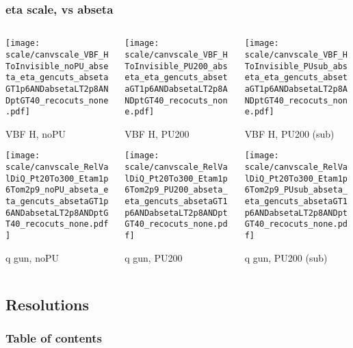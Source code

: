 \documentclass[8pt]{beamer}
\begin{document}
  \begin{frame}
  \frametitle{eta scale, vs abseta}
  
  \begin{columns}
   \begin{column}{0.35\textwidth}
     \texttt{[image: scale/canvscale\_VBF\_HToInvisible\_noPU\_abseta\_eta\_gencuts\_absetaGT1p6ANDabsetaLT2p8ANDptGT40\_recocuts\_none.pdf]}
     
     VBF H, noPU
    
     \texttt{[image: scale/canvscale\_RelValDiQ\_Pt20To300\_Etam1p6Tom2p9\_noPU\_abseta\_eta\_gencuts\_absetaGT1p6ANDabsetaLT2p8ANDptGT40\_recocuts\_none.pdf]}
     
     q gun, noPU
   \end{column}
   \begin{column}{0.35\textwidth}
     \texttt{[image: scale/canvscale\_VBF\_HToInvisible\_PU200\_abseta\_eta\_gencuts\_absetaGT1p6ANDabsetaLT2p8ANDptGT40\_recocuts\_none.pdf]}
     
     VBF H, PU200
    
     \texttt{[image: scale/canvscale\_RelValDiQ\_Pt20To300\_Etam1p6Tom2p9\_PU200\_abseta\_eta\_gencuts\_absetaGT1p6ANDabsetaLT2p8ANDptGT40\_recocuts\_none.pdf]}
     
     q gun, PU200
   \end{column}
   \begin{column}{0.35\textwidth}
     \texttt{[image: scale/canvscale\_VBF\_HToInvisible\_PUsub\_abseta\_eta\_gencuts\_absetaGT1p6ANDabsetaLT2p8ANDptGT40\_recocuts\_none.pdf]}
     
     VBF H, PU200 (sub)
    
     \texttt{[image: scale/canvscale\_RelValDiQ\_Pt20To300\_Etam1p6Tom2p9\_PUsub\_abseta\_eta\_gencuts\_absetaGT1p6ANDabsetaLT2p8ANDptGT40\_recocuts\_none.pdf]}
     
     q gun, PU200 (sub)
   \end{column}
  \end{columns}
 \end{frame}
 
 \subsection{Resolutions}

\begin{frame}
 \frametitle{Table of contents}
 
\end{frame}
 
\end{document}
